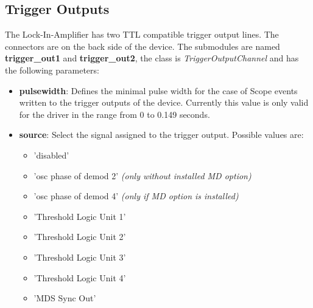\documentclass[11pt]{article} %
\begin{document}
\subsection{Trigger Outputs}
The Lock-In-Amplifier has two TTL compatible trigger output lines. The connectors are on the back side of the device. The submodules are named {\bf trigger\_out1} and {\bf trigger\_out2}, the class is {\it TriggerOutputChannel} and has the following parameters:
\begin{itemize}
\item {\bf pulsewidth}: Defines the minimal pulse width for the case of Scope events written to the trigger outputs of the device. Currently this value is only valid for the driver in the range from 0 to 0.149 seconds.
\item {\bf source}: Select the signal assigned to the trigger output. Possible values are:
	\begin{itemize}[ ]
	\itemsep0pt
	\item 'disabled'
	\item 'osc phase of demod 2' {\it (only without installed MD option)}
	\item 'osc phase of demod 4' {\it (only if MD option is installed)}
	\item 'Threshold Logic Unit 1'
	\item 'Threshold Logic Unit 2'
	\item 'Threshold Logic Unit 3'
	\item 'Threshold Logic Unit 4'
	\item 'MDS Sync Out'
  	\end{itemize}
\end{itemize}
\end{document}
